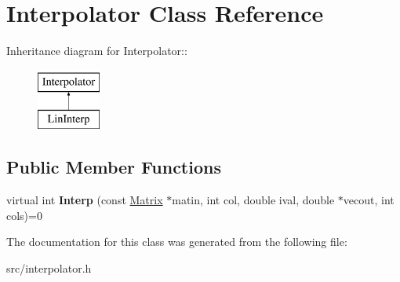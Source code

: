 \hypertarget{classInterpolator}{
\section{Interpolator Class Reference}
\label{d3/df3/classInterpolator}
}
Inheritance diagram for Interpolator::\begin{figure}[H]
\begin{center}
\leavevmode
\includegraphics[height=2cm]{d3/df3/classInterpolator}
\end{center}
\end{figure}
\subsection*{Public Member Functions}
\begin{DoxyCompactItemize}
\item 
\hypertarget{classInterpolator_a2238defccb009047f624bda33cc47c73}{
virtual int {\bfseries Interp} (const \hyperlink{classMatrix}{Matrix} $\ast$matin, int col, double ival, double $\ast$vecout, int cols)=0}
\label{d3/df3/classInterpolator_a2238defccb009047f624bda33cc47c73}

\end{DoxyCompactItemize}


The documentation for this class was generated from the following file:\begin{DoxyCompactItemize}
\item 
src/interpolator.h\end{DoxyCompactItemize}
